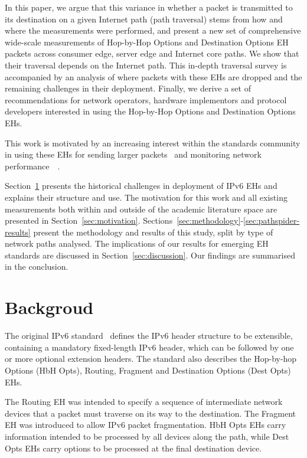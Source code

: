 \documentclass[conference]{IEEEtran}
\begin{document}
In this paper, we argue that this variance in whether a packet is transmitted to its destination on a given Internet path (path traversal) stems from how and where the measurements were performed, and present a new set of comprehensive wide-scale measurements of Hop-by-Hop Options and Destination Options EH packets across consumer edge, server edge and Internet core paths. We show that their traversal depends on the Internet path. This in-depth traversal survey is accompanied by an analysis of where packets with these EHs are dropped and the remaining challenges in their deployment. Finally, we derive a set of recommendations for network operators, hardware implementors and protocol developers interested in using the Hop-by-Hop Options and Destination Options EHs.

This work is motivated by an increasing interest within the standards community in using these EHs for sending larger packets~\cite{rfc9268} and monitoring network performance~\cite{rfc8250}~\cite{ietf-ippm-ioam-ipv6-options-10}.

Section~\ref{sec:background} presents the historical challenges in deployment of IPv6 EHs and explains their structure and use. The motivation for this work and all existing measurements both within and outside of the academic literature space are presented in Section~\ref{sec:motivation}.
Sections~\ref{sec:methodology}-\ref{sec:pathspider-results} present the methodology and results of this study, split by type of network paths analysed.
The implications of our results for emerging EH standards are discussed in Section~\ref{sec:discussion}. Our findings are summarised in the conclusion.

\section{Backgroud}
\label{sec:background}

\label{sec:ipv6-option-deployment}
The original IPv6 standard~\cite{rfc2460} defines the IPv6 header structure to be extensible, containing a mandatory fixed-length IPv6 header, which can be followed by one or more optional extension headers. The standard also describes the  Hop-by-hop Options (HbH Opts), Routing, Fragment and Destination Options (Dest Opts) EHs.

The Routing EH was intended to specify a sequence of intermediate network devices that a packet must traverse on its way to the destination. The Fragment EH was introduced to allow IPv6 packet fragmentation. 
HbH Opts EHs carry information intended to be processed by all devices along the path, while Dest Opts EHs carry options to be processed at the final destination device.
\end{document}
